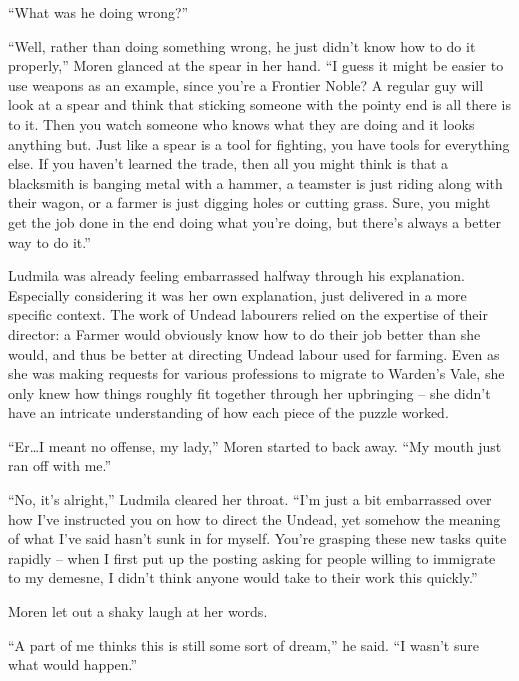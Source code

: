  

“What was he doing wrong?”

 

“Well, rather than doing something wrong, he just didn’t know how to do it properly,” Moren glanced at the spear in her hand. “I guess it might be easier to use weapons as an example, since you’re a Frontier Noble? A regular guy will look at a spear and think that sticking someone with the pointy end is all there is to it. Then you watch someone who knows what they are doing and it looks anything but. Just like a spear is a tool for fighting, you have tools for everything else. If you haven’t learned the trade, then all you might think is that a blacksmith is banging metal with a hammer, a teamster is just riding along with their wagon, or a farmer is just digging holes or cutting grass. Sure, you might get the job done in the end doing what you’re doing, but there’s always a better way to do it.”

 

Ludmila was already feeling embarrassed halfway through his explanation. Especially considering it was her own explanation, just delivered in a more specific context. The work of Undead labourers relied on the expertise of their director: a Farmer would obviously know how to do their job better than she would, and thus be better at directing Undead labour used for farming. Even as she was making requests for various professions to migrate to Warden’s Vale, she only knew how things roughly fit together through her upbringing – she didn’t have an intricate understanding of how each piece of the puzzle worked.

 

“Er…I meant no offense, my lady,” Moren started to back away. “My mouth just ran off with me.”

 

“No, it’s alright,” Ludmila cleared her throat. “I’m just a bit embarrassed over how I’ve instructed you on how to direct the Undead, yet somehow the meaning of what I’ve said hasn’t sunk in for myself. You’re grasping these new tasks quite rapidly – when I first put up the posting asking for people willing to immigrate to my demesne, I didn’t think anyone would take to their work this quickly.”

 

Moren let out a shaky laugh at her words.

 

“A part of me thinks this is still some sort of dream,” he said. “I wasn’t sure what would happen.”


